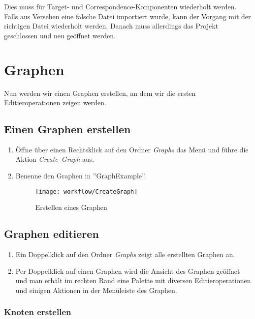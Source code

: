 	Dies muss für Target- und Correspondence-Komponenten wiederholt werden. \\
	Falls aus Versehen eine falsche Datei importiert wurde, kann der Vorgang mit der richtigen Datei wiederholt 
	werden. Danach muss allerdings das Projekt geschlossen und neu geöffnet werden.

	\section{Graphen}
	Nun werden wir einen Graphen erstellen, an dem wir die ersten Editieroperationen zeigen werden.

		\subsection{Einen Graphen erstellen}

			\begin{enumerate}
				\item Öffne über einen Rechtsklick auf den Ordner \textit{Graphs} das Menü und führe die Aktion \textit{Create\ Graph} aus.
				\item Benenne den Graphen in ''GraphExample''.
			
			\begin{figure}[h!]
				\centering
				\texttt{[image: workflow/CreateGraph]}
				\caption{Erstellen eines Graphen}
				\label{fig:createGraph}
			\end{figure}			
			
			\end{enumerate}
			
		\subsection{Graphen editieren}
		\label{section:graphEditieren}
			\begin{enumerate}
				\item Ein Doppelklick auf den Ordner \textit{Graphs} zeigt alle erstellten Graphen an.

				\item Per Doppelklick auf einen Graphen wird die Ansicht des Graphen geöffnet und man erhält im 
				rechten Rand eine Palette mit diversen Editieroperationen und einigen Aktionen in der Menüleiste 
				des Graphen.
			\end{enumerate}
			
			\subsubsection{Knoten erstellen}
	
